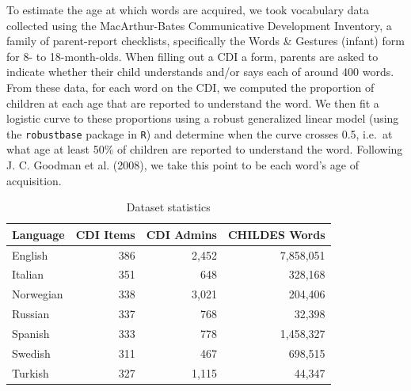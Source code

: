 \documentclass[10pt, letterpaper]{article}
\begin{document}
To estimate the age at which words are acquired, we took vocabulary data
collected using the MacArthur-Bates Communicative Development Inventory,
a family of parent-report checklists, specifically the Words \& Gestures
(infant) form for 8- to 18-month-olds. When filling out a CDI a form,
parents are asked to indicate whether their child understands and/or
says each of around 400 words. From these data, for each word on the
CDI, we computed the proportion of children at each age that are
reported to understand the word. We then fit a logistic curve to these
proportions using a robust generalized linear model (using the
\texttt{robustbase} package in \texttt{R}) and determine when the curve
crosses 0.5, i.e.~at what age at least 50\% of children are reported to
understand the word. Following J. C. Goodman et al. (2008), we take this
point to be each word's age of acquisition.

\begin{table}[t]
\centering
\begin{tabular}{lrrr}
  \hline
Language & CDI Items & CDI Admins & CHILDES Words \\ 
  \hline
English & 386 & 2,452 & 7,858,051 \\ 
  Italian & 351 & 648 & 328,168 \\ 
  Norwegian & 338 & 3,021 & 204,406 \\ 
  Russian & 337 & 768 & 32,398 \\ 
  Spanish & 333 & 778 & 1,458,327 \\ 
  Swedish & 311 & 467 & 698,515 \\ 
  Turkish & 327 & 1,115 & 44,347 \\ 
   \hline
\end{tabular}
\caption{Dataset statistics} 
\end{table}

\setlength\tabcolsep{1pt}
\end{document}
